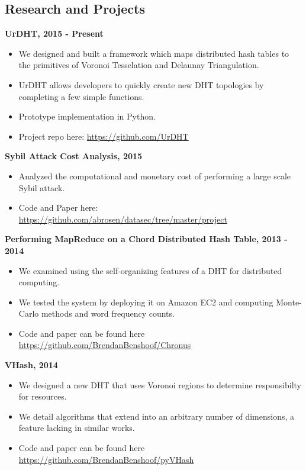 \documentclass{res}
\begin{document}
\begin{resume}
    
    
\newpage
\section{Research and Projects}

{\bf UrDHT, 2015 - Present }
\begin{itemize}
	\item We designed and built a framework which maps distributed hash tables to the primitives of Voronoi Tesselation and Delaunay Triangulation.
	\item UrDHT allows developers to quickly create new DHT topologies by completing a few simple functions. 
	\item Prototype implementation in Python.
	\item Project repo here: \url{https://github.com/UrDHT}
\end{itemize}

{\bf Sybil Attack Cost Analysis, 2015}
\begin{itemize}
	\item Analyzed the computational and monetary cost of performing a large scale Sybil attack.
	\item Code and Paper here: \url{https://github.com/abrosen/datasec/tree/master/project}
\end{itemize}



{\bf Performing MapReduce on a Chord Distributed Hash Table, 2013 - 2014}
    \begin{itemize}
    \item We examined using the self-organizing features of a DHT for distributed computing.
    \item We tested the system by deploying it on Amazon EC2 and computing Monte-Carlo methods and word frequency counts. 
    \item Code and paper can be found here \url{https://github.com/BrendanBenshoof/Chronus}
    \end{itemize}
    
{\bf VHash, 2014}
    \begin{itemize}
    \item We designed a new DHT that uses Voronoi regions to determine responsibilty for resources.
    \item We detail algorithms that extend into an arbitrary number of dimensions, a feature lacking in similar works.
    \item Code and paper can be found here \url{https://github.com/BrendanBenshoof/pyVHash}
    \end{itemize}   



\end{resume}
\end{document}

